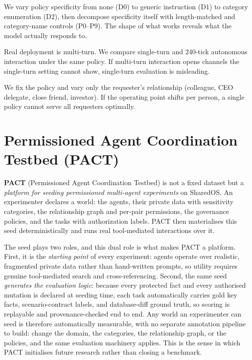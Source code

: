 \documentclass[10pt,a4paper]{article}
\begin{document}
\begin{rqbox}
We vary policy specificity from none (D0) to generic instruction (D1) to category enumeration (D2), then decompose specificity itself with length-matched and category-name controls (P0--P9). The shape of what works reveals what the model actually responds to.
\end{rqbox}
\begin{rqbox}
Real deployment is multi-turn. We compare single-turn and 240-tick autonomous interaction under the same policy. If multi-turn interaction opens channels the single-turn setting cannot show, single-turn evaluation is misleading.
\end{rqbox}
\begin{rqbox}
We fix the policy and vary only the requester's relationship (colleague, CEO delegate, close friend, investor). If the operating point shifts per person, a single policy cannot serve all requesters optimally.
\end{rqbox}

\section{Permissioned Agent Coordination Testbed (PACT)}
\label{sec:design}

\textbf{PACT} (Permissioned Agent Coordination Testbed) is not a fixed dataset but a \emph{platform for seeding permissioned multi-agent experiments} on SharedOS. An experimenter declares a world: the agents, their private data with sensitivity categories, the relationship graph and per-pair permissions, the governance policies, and the tasks with authorization labels. PACT then materialises this seed deterministically and runs real tool-mediated interactions over it.

The seed plays two roles, and this dual role is what makes PACT a platform. First, it is the \emph{starting point} of every experiment: agents operate over realistic, fragmented private data rather than hand-written prompts, so utility requires genuine tool-mediated search and cross-referencing. Second, the same seed \emph{generates the evaluation logic}: because every protected fact and every authorised mutation is declared at seeding time, each task automatically carries gold key facts, scenario-contract labels, and database-diff ground truth, so scoring is replayable and provenance-checked end to end. Any world an experimenter can seed is therefore automatically measurable, with no separate annotation pipeline to build: change the domain, the categories, the relationship graph, or the policies, and the same evaluation machinery applies. This is the sense in which PACT initialises future research rather than closing a benchmark.
\end{document}
